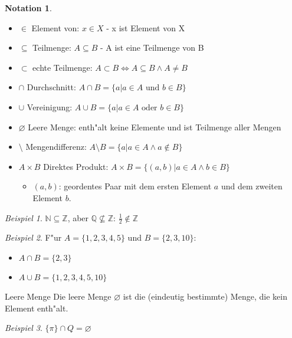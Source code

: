 \documentclass[11pt]{article}
\newcommand{\gq}[1]{\glqq{}#1\grqq{}} %
\theoremstyle{remark}
\newtheorem{exa}{Beispiel}[section]
\theoremstyle{definition}
\newtheorem*{notation}{Notation}
\theoremstyle{remark}
\begin{document}
\begin{notation}\
\begin{itemize}
\item \(\in\) Element von: \(x\in X\) - \gq{x ist Element von X}
\item \(\subseteq\) Teilmenge: \(A\subseteq B\) - \gq{A ist eine Teilmenge von B}
\item \(\subset\) echte Teilmenge: \(A\subset B \iff A\subseteq B \land A \neq B\)
\item \(\cap\) Durchschnitt: \(A\cap B = \{a|a\in A \text{ und } b\in B\}\)
\item \(\cup\) Vereinigung: \(A\cup B = \{a|a\in A \text{ oder } b\in B\}\)
\item \(\varnothing\) Leere Menge: enth"alt keine Elemente und ist Teilmenge aller Mengen
\item \(\setminus\) Mengendifferenz: \( A\setminus B = \{a|a\in A \land a\notin B \} \)
\item \(A\times B\) Direktes Produkt: \(A \times B = \{(a,b)|a\in A\land b\in B \} \)
\begin{itemize}
	\item \((a,b)\): geordentes Paar mit dem ersten Element \(a\) und dem zweiten
	Element \(b\).
\end{itemize}
\end{itemize}
\end{notation}

\begin{exa}
\(\mathbb{N}\subseteq \mathbb{Z}\), aber \(\mathbb{Q} \nsubseteq \mathbb{Z}\): \(\frac{1}{2} \notin \mathbb{Z}\)
\end{exa}

\begin{exa}
F"ur \(A = \{1,2,3,4,5\}\) und \(B = \{2,3,10\}\):
\begin{itemize}
\item \(A\cap B = \{2,3\}\)
\item \(A\cup B = \{1,2,3,4,5,10\}\)
\end{itemize}
\end{exa}

\begin{definition}{Leere Menge}{}
Die leere Menge \(\varnothing\) ist die (eindeutig bestimmte) Menge, die kein Element enth"alt.
\end{definition}

\begin{exa}
\(\{\pi\} \cap Q = \varnothing\)
\end{exa}
\end{document}
